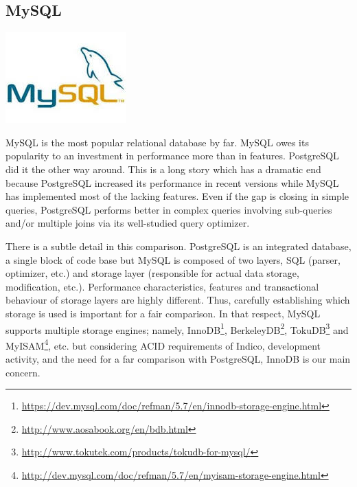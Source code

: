 \vspace{1.2cm}

\subsection{MySQL}

\vspace{-2.2cm} \hspace{3.2cm} \includegraphics[scale=0.5]{3/figures/mysql.jpg}

MySQL is the most popular relational database by far. MySQL owes its popularity to an investment in performance more than in features. PostgreSQL did it the other way around. This is a long story which has a dramatic end because PostgreSQL increased its performance in recent versions while MySQL has implemented most of the lacking features. Even if the gap is closing in simple queries, PostgreSQL performs better in complex queries involving sub-queries and/or multiple joins via its well-studied query optimizer.

There is a subtle detail in this comparison. PostgreSQL is an integrated database, a single block of code base but MySQL is composed of two layers, SQL (parser, optimizer, etc.) and storage layer (responsible for actual data storage, modification, etc.). Performance characteristics, features and transactional behaviour of storage layers are highly different. Thus, carefully establishing which storage is used is important for a fair comparison. In that respect, MySQL supports multiple storage engines; namely, InnoDB\footnote{\url{https://dev.mysql.com/doc/refman/5.7/en/innodb-storage-engine.html}}, BerkeleyDB\footnote{\url{http://www.aosabook.org/en/bdb.html}}, TokuDB\footnote{\url{http://www.tokutek.com/products/tokudb-for-mysql/}} and MyISAM\footnote{\url{http://dev.mysql.com/doc/refman/5.7/en/myisam-storage-engine.html}}, etc. but considering ACID requirements of Indico, development activity, and the need for a far comparison with PostgreSQL, InnoDB is our main concern.

